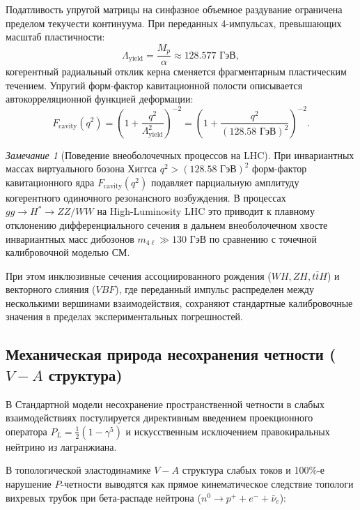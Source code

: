 \documentclass[11pt,a4paper]{article}
\theoremstyle{definition}
\theoremstyle{remark}
\newtheorem{remark}{Замечание}[section]
\begin{document}
Податливость упругой матрицы на синфазное объемное раздувание ограничена пределом текучести континуума. При переданных 4-импульсах, превышающих масштаб пластичности:
\begin{equation}
    \Lambda_{\mathrm{yield}} = \frac{M_p}{\alpha} \approx 128.577\text{ ГэВ},
\end{equation}
когерентный радиальный отклик керна сменяется фрагментарным пластическим течением. Упругий форм-фактор кавитационной полости описывается автокорреляционной функцией деформации:
\begin{equation}
    F_{\mathrm{cavity}}(q^2) = \left( 1 + \frac{q^2}{\Lambda_{\mathrm{yield}}^2} \right)^{-2} = \left( 1 + \frac{q^2}{(128.58\text{ ГэВ})^2} \right)^{-2}.
    \label{eq:higgs_form_factor}
\end{equation}

\begin{remark}[Поведение внеоболочечных процессов на LHC]
При инвариантных массах виртуального бозона Хиггса $q^2 > (128.58\text{ ГэВ})^2$ форм-фактор кавитационного ядра $F_{\mathrm{cavity}}(q^2)$ подавляет парциальную амплитуду когерентного одиночного резонансного возбуждения. В процессах $gg \to H^* \to ZZ/WW$ на High-Luminosity LHC это приводит к плавному отклонению дифференциального сечения в дальнем внеоболочечном хвосте инвариантных масс дибозонов $m_{4\ell} \gg 130\text{ ГэВ}$ по сравнению с точечной калибровочной моделью СМ. 

При этом инклюзивные сечения ассоциированного рождения ($WH, ZH, t\bar{t}H$) и векторного слияния ($VBF$), где переданный импульс распределен между несколькими вершинами взаимодействия, сохраняют стандартные калибровочные значения в пределах экспериментальных погрешностей.
\end{remark}

\subsection{Механическая природа несохранения четности ($V-A$ структура)}
В Стандартной модели несохранение пространственной четности в слабых взаимодействиях постулируется директивным введением проекционного оператора $P_L = \frac{1}{2}(1 - \gamma^5)$ и искусственным исключением правокиральных нейтрино из лагранжиана. 

В топологической эластодинамике $V-A$ структура слабых токов и 100\%-е нарушение $P$-четности выводятся как прямое кинематическое следствие топологи вихревых трубок при бета-распаде нейтрона ($n^0 \to p^+ + e^- + \bar{\nu}_e$):
\end{document}

